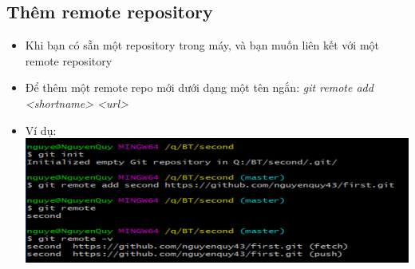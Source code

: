 \documentclass[12pt,a4paper]{report}
\begin{document}
\subsection{Thêm remote repository} 
\begin{itemize}
\item Khi bạn có sẵn một repository trong máy, và bạn muốn liên kết với một remote repository
\item Để thêm một remote repo mới dưới dạng một tên ngắn: {\it git remote add <shortname> <url>}
\item Ví dụ: 
\vskip 0.4cm
	\includegraphics[width=0.8\linewidth]{screenshot034}
	
	\label{fig:screenshot034}
\end{itemize}
\end{document}
